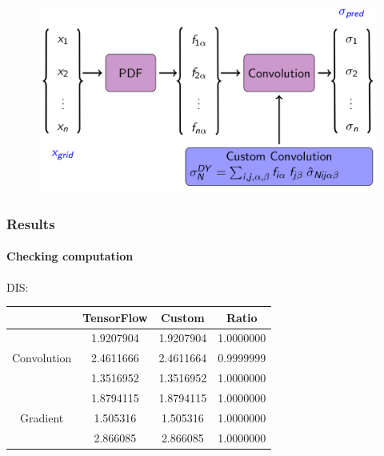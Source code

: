 \documentclass[aspectratio=43]{beamer}
\begin{document}
\begin{frame}

	\begin{figure}
		\includegraphics[width = 8.5 cm]{plots/section2/TF_convolution2.png}
	\end{figure}

\end{frame}

\begin{frame}

	\frametitle{Results}
	\framesubtitle{Checking computation}
	
	{\Large DIS:}
	\begin{table}
		\centering
		\begin{tabular}{c c c c}
			& TensorFlow & Custom & Ratio \\ \hline
			& 1.9207904 & 1.9207904 & {\color{darkgreen} 1.0000000} \\
			Convolution & 2.4611666 & 2.4611664 & {\color{darkgreen} 0.9999999} \\
			& 1.3516952 & 1.3516952 & {\color{darkgreen} 1.0000000} \\
			\hline
			& 1.8794115 & 1.8794115 & {\color{darkgreen} 1.0000000} \\
			Gradient & 1.505316 & 1.505316 & {\color{darkgreen} 1.0000000} \\
			& 2.866085 & 2.866085 & {\color{darkgreen} 1.0000000} \\
			\hline
		\end{tabular}
	\end{table}

\end{frame}
\end{document}
